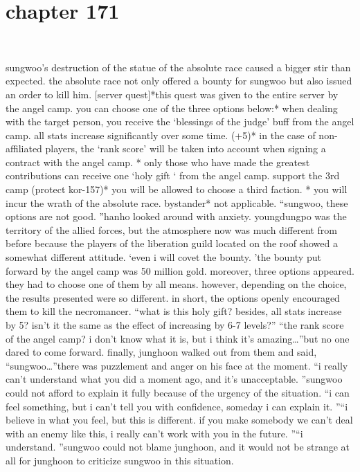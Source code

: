 \section{chapter 171}

                             




sungwoo’s destruction of the statue of the absolute race caused a bigger stir than expected.
 the absolute race not only offered a bounty for sungwoo but also issued an order to kill him.
[server quest]*this quest was given to the entire server by the angel camp.
 you can choose one of the three options below:* when dealing with the target person, you receive the ‘blessings of the judge’ buff from the angel camp.
 all stats increase significantly over some time.
 (+5)* in the case of non-affiliated players, the ‘rank score’ will be taken into account when signing a contract with the angel camp.
* only those who have made the greatest contributions can receive one ‘holy gift ‘ from the angel camp.
support the 3rd camp (protect kor-157)* you will be allowed to choose a third faction.
* you will incur the wrath of the absolute race.
bystander* not applicable.
“sungwoo, these options are not good.
”hanho looked around with anxiety.
 youngdungpo was the territory of the allied forces, but the atmosphere now was much different from before because the players of the liberation guild located on the roof showed a somewhat different attitude.
‘even i will covet the bounty.
’the bounty put forward by the angel camp was 50 million gold.
 moreover, three options appeared.
 they had to choose one of them by all means.
however, depending on the choice, the results presented were so different.
 in short, the options openly encouraged them to kill the necromancer.
“what is this holy gift? besides, all stats increase by 5? isn’t it the same as the effect of increasing by 6-7 levels?”
“the rank score of the angel camp? i don’t know what it is, but i think it’s amazing…”but no one dared to come forward.
finally, junghoon walked out from them and said, “sungwoo…”there was puzzlement and anger on his face at the moment.
“i really can’t understand what you did a moment ago, and it’s unacceptable.
”sungwoo could not afford to explain it fully because of the urgency of the situation.
“i can feel something, but i can’t tell you with confidence, someday i can explain it.
”“i believe in what you feel, but this is different.
 if you make somebody we can’t deal with an enemy like this, i really can’t work with you in the future.
”“i understand.
”sungwoo could not blame junghoon, and it would not be strange at all for junghoon to criticize sungwoo in this situation.
